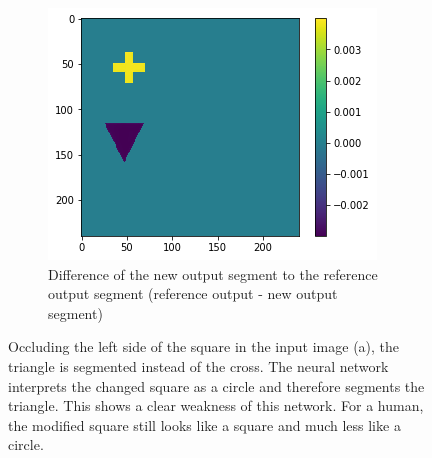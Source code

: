 \begin{figure}[H]
    \begin{subfigure}[t]{.33\textwidth}
        \centering
        \includegraphics[width=\linewidth]{chapters/06_hdm/images_analyze/2c_diff.png}
        \caption{Difference of the new output segment to the reference output segment (reference output - new output segment)}
    \end{subfigure}
    \caption{Occluding the left side of the square in the input image (a), the triangle is segmented instead of the cross. The neural network interprets the changed square as a circle and therefore segments the triangle. This shows a clear weakness of this network. For a human, the modified square still looks like a square and much less like a circle.}
    \label{hdm_changed_output_4}
\end{figure}

